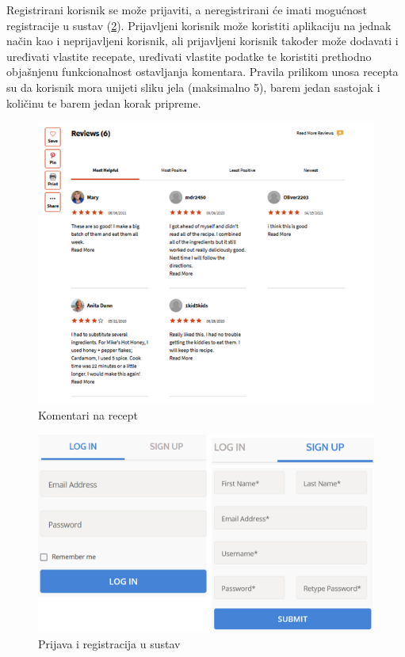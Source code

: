 Registrirani korisnik se može prijaviti, a neregistrirani će imati mogućnost registracije u sustav (\ref{fig:promjene4}). Prijavljeni korisnik može koristiti aplikaciju na jednak način kao i neprijavljeni korisnik, ali prijavljeni korisnik također može dodavati i uređivati vlastite recepate, uređivati vlastite podatke te koristiti prethodno objašnjenu funkcionalnost ostavljanja komentara. Pravila prilikom unosa recepta su da korisnik mora unijeti sliku jela (maksimalno 5), barem jedan sastojak i količinu te barem jedan korak pripreme.
\begin{figure}[H]
	\includegraphics[scale=0.8]{slike/Slika3.PNG} %
	\centering
	\caption{Komentari na recept}
	\label{fig:promjene3}
\end{figure}

\begin{figure}[H]
	\includegraphics[scale=0.8]{slike/Slika4.PNG} %
	\centering
	\caption{Prijava i registracija u sustav}
	\label{fig:promjene4}
\end{figure}

